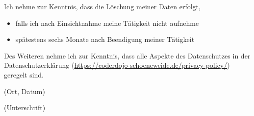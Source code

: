 \documentclass[11pt]{article}
\newcommand{\hint}[1]{{\footnotesize\color{gray}#1}}
\newlength{\tfl}%
\newcommand{\TextFieldFill}[2][]{%
    \setlength{\tfl}{\linewidth}%
    \settowidth{\dimen0}{#2}%
    \addtolength{\tfl}{-\dimen0}%
    \addtolength{\tfl}{-1em}%
    \TextField[#1, bordercolor={}, backgroundcolor={}, width=\tfl]{#2}%
}
\begin{document}
\begin{Form}
    Ich nehme zur Kenntnis, dass die Löschung meiner Daten erfolgt,

    \begin{itemize}
        \item falls ich nach Einsichtnahme meine Tätigkeit nicht aufnehme
        \item spätestens sechs Monate nach Beendigung meiner Tätigkeit
    \end{itemize}

    Des Weiteren nehme ich zur Kenntnis, dass alle Aspekte des Datenschutzes in der Datenschutzerklärung (\url{https://coderdojo-schoeneweide.de/privacy-policy/}) geregelt sind.

    \vspace{2cm}

    \begin{minipage}{0.4\textwidth}
        \TextFieldFill[name=dateplace]{}
        \hint{(Ort, Datum)}
    \end{minipage}
    \begin{minipage}{0.6\textwidth}
        \vspace{1.2em}
        \hrulefill

        \hint{(Unterschrift)}
    \end{minipage}
    \end{Form}
\end{document}
